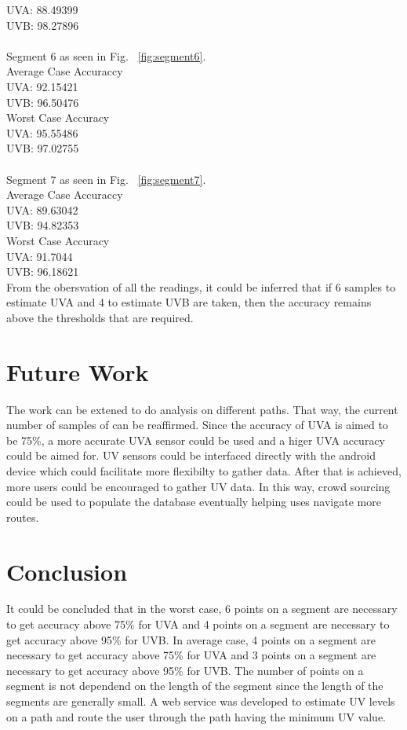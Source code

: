 \documentclass[12pt,fullpage,doublespace]{article}
\begin{document}
UVA:  88.49399\\
UVB:  98.27896\\
\mbox{}\\
Segment 6 as seen in Fig. ~\ref{fig:segment6}. \\
Average Case Accuraccy\\
UVA:  92.15421\\
UVB:  96.50476\\
Worst Case Accuracy\\
UVA:  95.55486\\
UVB:  97.02755\\
\mbox{}\\
Segment 7 as seen in Fig. ~\ref{fig:segment7}. \\
Average Case Accuraccy\\
UVA:  89.63042\\
UVB:  94.82353\\
Worst Case Accuracy\\
UVA:  91.7044\\
UVB:  96.18621\\


From the obersvation of all the readings, it could be inferred that if 6 samples to estimate UVA and 4 to estimate UVB are taken, then the accuracy remains above the thresholds that are required.

\newpage
\section{Future Work}
The work can be extened to do analysis on different paths. That way, the current number of samples of can be reaffirmed. Since the accuracy of UVA is aimed to be 75\%, a more accurate UVA sensor could be used and a higer UVA accuracy could be aimed for. UV sensors could be interfaced directly with the android device which could facilitate more flexibilty to gather data. After that is achieved, more users could be encouraged to gather UV data. In this way, crowd sourcing could be used to populate the database eventually helping uses navigate more routes.
\newpage
\section{Conclusion}
It could be concluded that in the worst case, 6 points on a segment are necessary to get accuracy above 75\% for UVA and 4 points on a segment are necessary to get accuracy above 95\% for UVB. In average case, 4 points on a segment are necessary to get accuracy above 75\% for UVA and  3 points on a segment are necessary to get accuracy above 95\% for UVB. The number of points on a segment is not dependend on the length of the segment since the length of the segments are generally small. A web service was developed to estimate UV levels on a path and route the user through the path having the minimum UV value.
\end{document}
